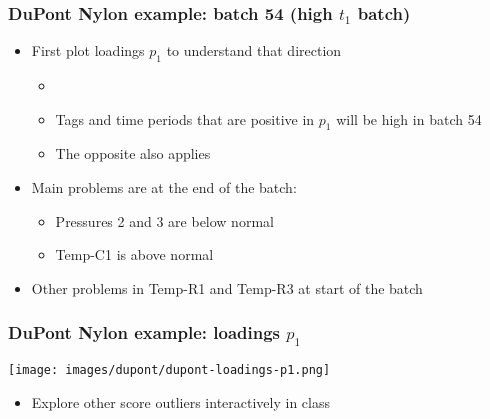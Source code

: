 \begin{frame}\frametitle{DuPont Nylon example: batch 54 (high \( t_1 \) batch)}
	\begin{itemize}
		\item	First plot loadings \( p_1 \) to understand that direction
			
				\begin{itemize}
					\item	{} 
					
					\item	Tags and time periods that are positive in \( p_1 \) will be high in batch 54
					
					\item	The opposite also applies
				\end{itemize}
		
		\item 	Main problems are at the end of the batch:
		
				\begin{itemize}
					\item	Pressures 2 and 3 are below normal
					
					\item	Temp-C1 is above normal
					
				\end{itemize}
		
		\item 	Other problems in Temp-R1 and Temp-R3 at start of the batch
	\end{itemize}
\end{frame}

\begin{frame}\frametitle{DuPont Nylon example: loadings \( p_1 \)}

\begin{center}
	\texttt{[image: images/dupont/dupont-loadings-p1.png]}
\end{center}

	\begin{itemize}
		\item	Explore other score outliers interactively in class
	\end{itemize}
\end{frame}

